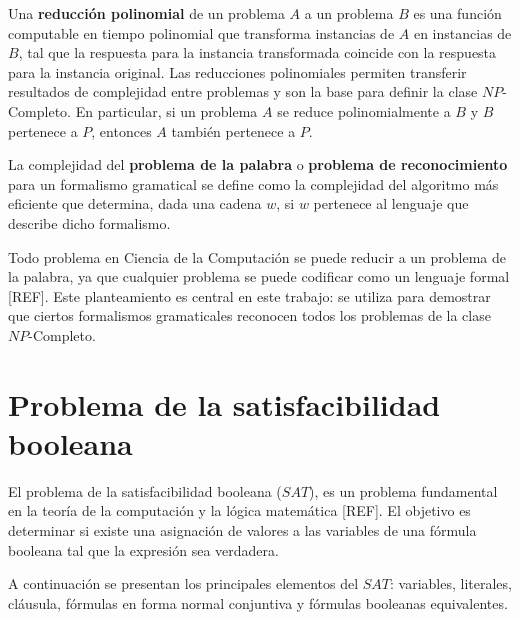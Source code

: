 \documentclass{report}
\theoremstyle{definition}
\theoremstyle{plain}
\theoremstyle{remark}
\begin{document}
Una \textbf{reducción polinomial} de un problema $A$ a un problema $B$
es una función computable en tiempo polinomial que transforma instancias
de $A$ en instancias de $B$, tal que la respuesta para la instancia
transformada coincide con la respuesta para la instancia original. Las
reducciones polinomiales permiten transferir resultados de complejidad
entre problemas y son la base para definir la clase $NP$-Completo. En
particular, si un problema $A$ se reduce polinomialmente a $B$ y $B$
pertenece a $P$, entonces $A$ también pertenece a $P$.

La complejidad del \textbf{problema de la palabra} o \textbf{problema de
reconocimiento} para un formalismo gramatical se define como la
complejidad del algoritmo más eficiente que determina, dada una cadena
$w$, si $w$ pertenece al lenguaje que describe dicho formalismo.

Todo problema en Ciencia de la Computación se puede reducir a un problema
de la palabra, ya que cualquier problema se puede codificar como un
lenguaje formal [REF]. Este planteamiento es central en este trabajo:
se utiliza para demostrar que ciertos formalismos gramaticales reconocen
todos los problemas de la clase $NP$-Completo.

\section{Problema de la satisfacibilidad booleana}
\label{sec:sat}

El problema de la satisfacibilidad booleana ($SAT$), es un problema
fundamental en la teoría de la computación y la lógica matemática
[REF]. El objetivo es determinar si existe una asignación de
valores a las variables de una fórmula booleana tal que la expresión sea
verdadera.

A continuación se presentan los principales elementos del $SAT$:
variables, literales, cláusula, fórmulas en forma normal conjuntiva y
fórmulas booleanas equivalentes.
\end{document}
